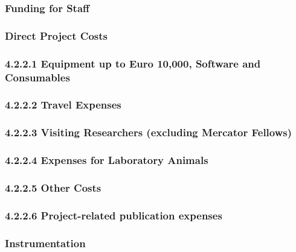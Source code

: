 \documentclass[11pt]{article}
\begin{document}
\vspace{-1ex}\subsubsection{Funding for Staff}

\vspace{-2ex}\subsubsection{Direct Project Costs}

\vspace{-1ex}\subsubsection*{4.2.2.1 Equipment up to Euro 10,000, Software and Consumables}

\vspace{-2ex}\subsubsection*{4.2.2.2 Travel Expenses}

\vspace{-2ex}\subsubsection*{4.2.2.3 Visiting Researchers (excluding Mercator Fellows) }

\vspace{-1ex}\subsubsection*{4.2.2.4 Expenses for Laboratory Animals }


\vspace{-1ex}\subsubsection*{4.2.2.5 Other Costs}

\vspace{-1ex}\subsubsection*{4.2.2.6 Project-related publication expenses}

\vspace{-1ex}\subsubsection{Instrumentation}
\end{document}
